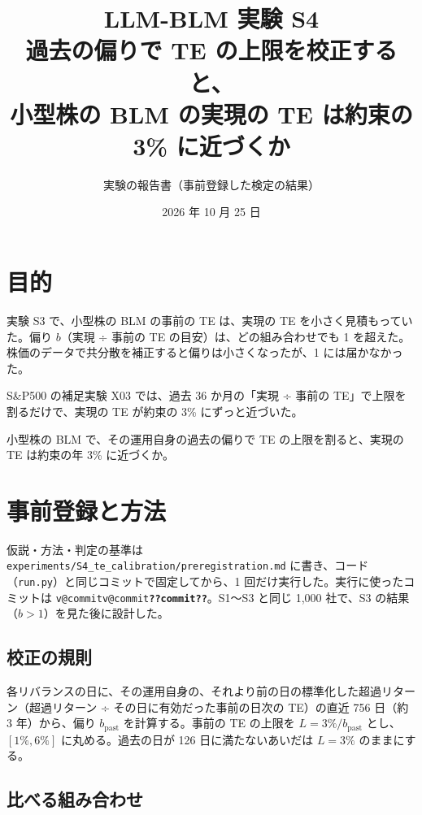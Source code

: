 \documentclass[xelatex,ja=standard,jafont=haranoaji,a4paper,10pt,openany]{bxjsreport}
\title{LLM-BLM 実験 S4\\[6pt]
  \large 過去の偏りで TE の上限を校正すると、\\小型株の BLM の実現の TE は約束の 3\% に近づくか}
\author{実験の報告書（事前登録した検定の結果）}
\date{2026 年 10 月 25 日}
\makeatletter
\newcommand{\V}[1]{\ifcsname v@#1\endcsname\csname v@#1\endcsname\else\textbf{??#1??}\fi}
\newcommand{\code}[1]{\texttt{#1}}
\newcommand{\SP}{S\&P500}
\makeatother
\begin{document}
\maketitle



\setcounter{tocdepth}{1}
{\small\tableofcontents}

\chapter{目的}\label{ch:purpose}

実験 S3 で、小型株の BLM の事前の TE は、実現の TE を小さく見積もっていた。偏り $b$（実現 ÷ 事前の TE の目安）は、どの組み合わせでも 1 を超えた。株価のデータで共分散を補正すると偏りは小さくなったが、1 には届かなかった。

\SP{} の補足実験 X03 では、過去 36 か月の「実現 ÷ 事前の TE」で上限を割るだけで、実現の TE が約束の 3\% にずっと近づいた。

\begin{keybox}[問い]
小型株の BLM で、その運用自身の過去の偏りで TE の上限を割ると、実現の TE は約束の年 3\% に近づくか。
\end{keybox}

\chapter{事前登録と方法}\label{ch:method}

仮説・方法・判定の基準は \code{experiments/S4\_te\_calibration/preregistration.md} に書き、コード（\code{run.py}）と同じコミットで固定してから、1 回だけ実行した。実行に使ったコミットは \code{\V{commit}}。S1〜S3 と同じ 1,000 社で、S3 の結果（$b > 1$）を見た後に設計した。

\section{校正の規則}

各リバランスの日に、その運用自身の、それより前の日の標準化した超過リターン（超過リターン ÷ その日に有効だった事前の日次の TE）の直近 756 日（約 3 年）から、偏り $b_{\text{past}}$ を計算する。事前の TE の上限を $L = 3\% / b_{\text{past}}$ とし、$[1\%, 6\%]$ に丸める。過去の日が 126 日に満たないあいだは $L = 3\%$ のままにする。

\section{比べる組み合わせ}
\end{document}
